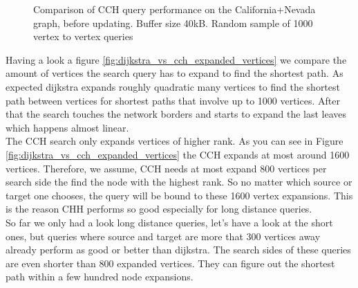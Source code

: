 \begin{figure}   
\caption{Comparison of CCH query performance on the California+Nevada graph, before updating. Buffer size 40kB. Random sample of 1000 vertex to vertex queries}
\label{fig:dijkstra_vs_cch_query_speed}
\end{figure}

Having a look a figure \ref{fig:dijkstra_vs_cch_expanded_vertices} we compare the amount of vertices the search query has to expand to find the shortest path. As expected dijkstra expands roughly quadratic many vertices to find the shortest path between vertices for shortest paths that involve up to 1000 vertices.
After that the search touches the network borders and starts to expand the last leaves which happens almost linear.\\
The CCH search only expands vertices of higher rank. As you can see in Figure \ref{fig:dijkstra_vs_cch_expanded_vertices} the CCH expands at most around 1600 vertices. Therefore, we assume, CCH needs at most expand 800 vertices per search side the find the node with the highest rank. So no matter which source or target one chooses, the query will be bound to these 1600 vertex expansions.
This is the reason CHH performs so good especially for long distance queries.
\\
So far we only had a look long distance queries, let's have a look at the short ones, but queries where source and target are more that 300 vertices away already perform as good or better than dijkstra. The search sides of these queries are even shorter than 800 expanded vertices. They can figure out the shortest path within a few hundred node expansions.

